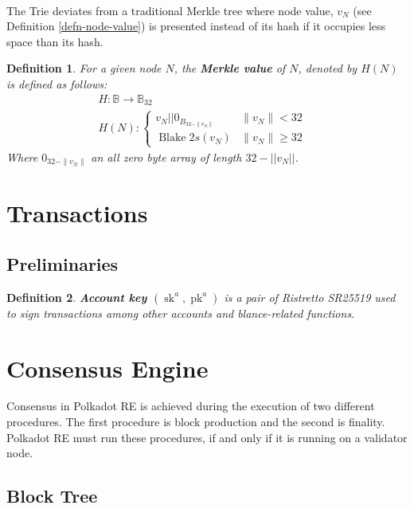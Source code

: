 \documentclass{article}
\newcommand{\tmop}[1]{\ensuremath{\operatorname{#1}}}
\newcommand{\tmstrong}[1]{\textbf{#1}}
\newcommand{\tmtextbf}[1]{{\bfseries{#1}}}
\newtheorem{definition}{Definition}
\providecommand{\tmop}[1]{\ensuremath{\mathrm{#1}}}
\providecommand{\tmstrong}[1]{\tmtextbf{#1}}
\providecommand{\tmtextbf}[1]{\tmtextbf{#1}}
\newtheorem{definition}{Definition}
\begin{document}
\

The Trie deviates from a traditional Merkle tree where node value, $v_N$ (see
Definition \ref{defn-node-value}) is presented instead of its hash if it
occupies less space than its hash.

\begin{definition}
  \label{defn-merkle-value}For a given node $N$, the {\tmstrong{Merkle value}}
  of $N$, denoted by $H (N)$ is defined as follows:
  \[ \begin{array}{lll}
       & H : \mathbb{B} \rightarrow \mathbb{B}_{32} & \\
       & H (N) : \left\{ \begin{array}{lll}
         v_N | | 0_{B_{32 - \| v_N \|}} & \|v_N \|< 32 & \\
         \tmop{Blake} 2 s (v_N) & \|v_N \| \geqslant 32 & 
       \end{array} \right. & 
     \end{array} \]
  Where $0_{32 - \| v_N \|}$ an all zero byte array of length $32 - | | v_N |
  |$.
\end{definition}

\section{Transactions}

\subsection{Preliminaries}

\begin{definition}
  \label{defn-account-key}{\tmstrong{Account key $(\tmop{sk}^a,
  \tmop{pk}^a)$}} is a pair of Ristretto SR25519 used to sign transactions
  among other accounts and blance-related functions.
\end{definition}

\section{Consensus Engine}

Consensus in Polkadot RE is achieved during the execution of two different
procedures. The first procedure is block production and the second is
finality. Polkadot RE must run these procedures, if and only if it is running
on a validator node.

\subsection{Block Tree}
\end{document}
